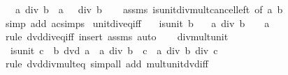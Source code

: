 \begin{isabellebody}
\ \ \ {\isachardoublequoteopen}a\ div\ {\isacharparenleft}{\kern0pt}b\ {\isacharasterisk}{\kern0pt}\ a{\isacharparenright}{\kern0pt}\ {\isacharequal}{\kern0pt}\ {}\ div\ b{\isachardoublequoteclose}\isanewline
%
\isadelimproof
\ \ %
\endisadelimproof
%
\isatagproof
{}\isamarkupfalse%
\ assms\ is{\isacharunderscore}{\kern0pt}unit{\isacharunderscore}{\kern0pt}div{\isacharunderscore}{\kern0pt}mult{\isacharunderscore}{\kern0pt}cancel{\isacharunderscore}{\kern0pt}left\ {\isacharbrackleft}{\kern0pt}of\ a\ b{\isacharbrackright}{\kern0pt}\ \isamarkupfalse%
\ {\isacharparenleft}{\kern0pt}simp\ add{\isacharcolon}{\kern0pt}\ ac{\isacharunderscore}{\kern0pt}simps{\isacharparenright}{\kern0pt}%
\endisatagproof
{\isafoldproof}%
%
\isadelimproof
\isanewline
%
\endisadelimproof
\isanewline
{}\isamarkupfalse%
\ unit{\isacharunderscore}{\kern0pt}div{\isacharunderscore}{\kern0pt}eq{\isacharunderscore}{\kern0pt}{}{\isacharunderscore}{\kern0pt}iff{\isacharcolon}{\kern0pt}\isanewline
\ \ \ {\isachardoublequoteopen}is{\isacharunderscore}{\kern0pt}unit\ b{\isachardoublequoteclose}\isanewline
\ \ \ {\isachardoublequoteopen}a\ div\ b\ {\isacharequal}{\kern0pt}\ {}\ {\isasymlongleftrightarrow}\ a\ {\isacharequal}{\kern0pt}\ {}{\isachardoublequoteclose}\isanewline
%
\isadelimproof
\ \ %
\endisadelimproof
%
\isatagproof
{}\isamarkupfalse%
\ {\isacharparenleft}{\kern0pt}rule\ dvd{\isacharunderscore}{\kern0pt}div{\isacharunderscore}{\kern0pt}eq{\isacharunderscore}{\kern0pt}{}{\isacharunderscore}{\kern0pt}iff{\isacharparenright}{\kern0pt}\ {\isacharparenleft}{\kern0pt}insert\ assms{\isacharcomma}{\kern0pt}\ auto{\isacharparenright}{\kern0pt}%
\endisatagproof
{\isafoldproof}%
%
\isadelimproof
\ \ \isanewline
%
\endisadelimproof
\isanewline
{}\isamarkupfalse%
\ div{\isacharunderscore}{\kern0pt}mult{\isacharunderscore}{\kern0pt}unit{}{\isacharcolon}{\kern0pt}\isanewline
\ \ {\isachardoublequoteopen}is{\isacharunderscore}{\kern0pt}unit\ c\ {\isasymLongrightarrow}\ b\ dvd\ a\ {\isasymLongrightarrow}\ a\ div\ {\isacharparenleft}{\kern0pt}b\ {\isacharasterisk}{\kern0pt}\ c{\isacharparenright}{\kern0pt}\ {\isacharequal}{\kern0pt}\ a\ div\ b\ div\ c{\isachardoublequoteclose}\isanewline
%
\isadelimproof
\ \ %
\endisadelimproof
%
\isatagproof
{}\isamarkupfalse%
\ {\isacharparenleft}{\kern0pt}rule\ dvd{\isacharunderscore}{\kern0pt}div{\isacharunderscore}{\kern0pt}mult{}{\isacharunderscore}{\kern0pt}eq{\isacharparenright}{\kern0pt}\ {\isacharparenleft}{\kern0pt}simp{\isacharunderscore}{\kern0pt}all\ add{\isacharcolon}{\kern0pt}\ mult{\isacharunderscore}{\kern0pt}unit{\isacharunderscore}{\kern0pt}dvd{\isacharunderscore}{\kern0pt}iff{\isacharparenright}{\kern0pt}%

\end{isabellebody}
